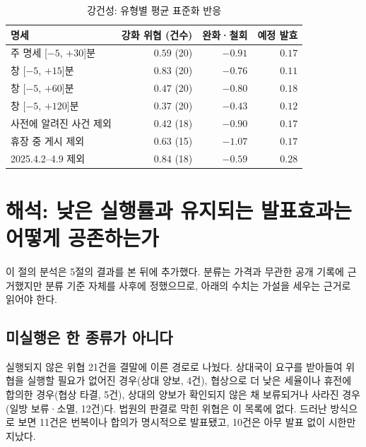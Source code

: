 \documentclass[11pt,a4paper]{article}
\newcommand{\tablefont}{\small\linespread{1.12}\selectfont}
\begin{document}
\begin{table}[H]
\caption{강건성: 유형별 평균 표준화 반응}\label{t:rob}
\tablefont
\begin{tabularx}{\textwidth}{@{}Yrrr@{}}
\toprule
명세 & 강화 위협 (건수) & 완화·철회 & 예정 발효\\
\midrule
주 명세 [$-5$, $+30$]분 & $0.59$ (20) & $-0.91$ & $0.17$\\
창 [$-5$, $+15$]분 & $0.83$ (20) & $-0.76$ & $0.11$\\
창 [$-5$, $+60$]분 & $0.47$ (20) & $-0.80$ & $0.18$\\
창 [$-5$, $+120$]분 & $0.37$ (20) & $-0.43$ & $0.12$\\
사전에 알려진 사건 제외 & $0.42$ (18) & $-0.90$ & $0.17$\\
휴장 중 게시 제외 & $0.63$ (15) & $-1.07$ & $0.17$\\
2025.4.2--4.9 제외 & $0.84$ (18) & $-0.59$ & $0.28$\\
\bottomrule
\end{tabularx}
\end{table}

\section{해석: 낮은 실행률과 유지되는 발표효과는 어떻게 공존하는가}

이 절의 분석은 5절의 결과를 본 뒤에 추가했다. 분류는 가격과 무관한 공개 기록에 근거했지만 분류 기준 자체를 사후에 정했으므로, 아래의 수치는 가설을 세우는 근거로 읽어야 한다.

\subsection{미실행은 한 종류가 아니다}

실행되지 않은 위협 21건을 결말에 이른 경로로 나눴다. 상대국이 요구를 받아들여 위협을 실행할 필요가 없어진 경우(상대 양보, 4건), 협상으로 더 낮은 세율이나 휴전에 합의한 경우(협상 타결, 5건), 상대의 양보가 확인되지 않은 채 보류되거나 사라진 경우(일방 보류·소멸, 12건)다. 법원의 판결로 막힌 위협은 이 목록에 없다. 드러난 방식으로 보면 11건은 번복이나 합의가 명시적으로 발표됐고, 10건은 아무 발표 없이 시한만 지났다.
\end{document}
